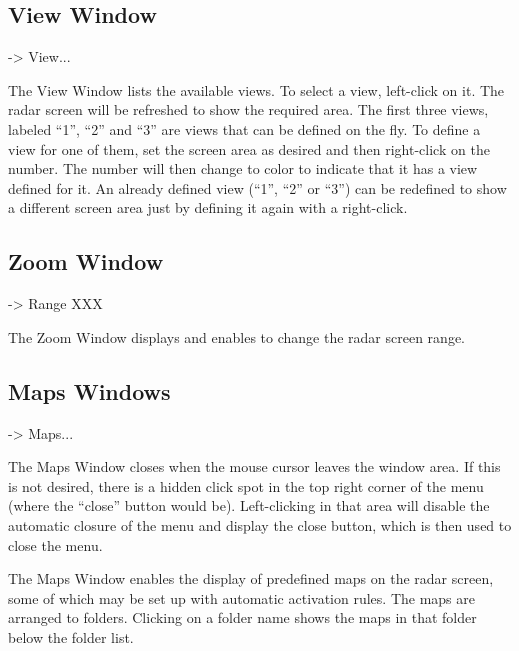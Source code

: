 \documentclass[a4paper,oneside,11pt]{memoir}
\begin{document}
\subsection{View Window}
\label{win:view}
 -> View...

\bigskip


The View Window lists the available views. To select a view, left-click on it. The radar screen will be refreshed to show the required area. The first three views, labeled “1”, “2” and “3” are views that can be defined on the fly. To define a view for one of them, set the screen area as desired and then right-click on the number. The number will then change to  color to indicate that it has a view defined for it. An already defined view (“1”, “2” or “3”) can be redefined to show a different screen area just by defining it again with a right-click.

\subsection{Zoom Window}
\label{win:zoom}
 -> Range XXX


\bigskip

The Zoom Window displays and enables to change the radar screen range.

\subsection{Maps Windows}
\label{win:mapsw}

 -> Maps...

\bigskip


The Maps Window closes when the mouse cursor leaves the window area. If this is not desired, there is a hidden click spot in the top right corner of the menu (where the “close” button would be). Left-clicking in that area will disable the automatic closure of the menu and display the close button, which is then used to close the menu.

\bigskip

The Maps Window enables the display of predefined maps on the radar screen, some of which may be set up with automatic activation rules. The maps are arranged to folders. Clicking on a folder name shows the maps in that folder below the folder list.
\end{document}
